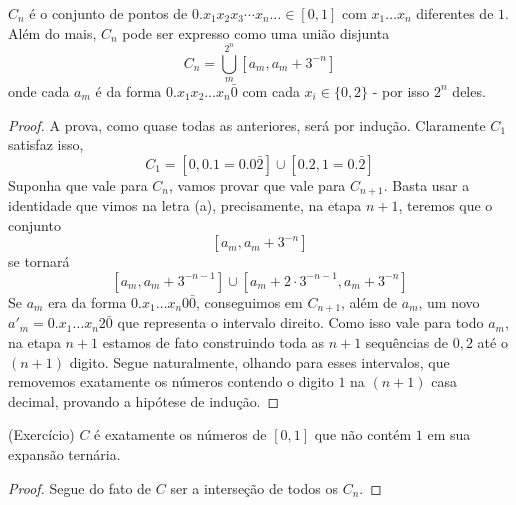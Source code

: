 \begin{enumerate}[label=(\alph*)]
    \begin{prop}
        $C_n$ é o conjunto de pontos de $ 0.x_1x_2x_3\cdots x_n\dots \in [0,1]$ com $x_1 \dots x_n$ diferentes de $1$.
        Além do mais, $C_n$ pode ser expresso como uma união disjunta
        $$C_n = \bigcup_m^{2^n} [a_m, a_m + 3^{-n}]$$
        onde cada $a_m$ é da forma $0.x_1x_2\dots x_n\bar{0}$ com cada $x_i \in \{0,2\}$ - por isso $2^n$ deles.
    \end{prop}
    \begin{proof}
        A prova, como quase todas as anteriores, será por indução. Claramente $C_1$ satisfaz isso,
        $$C_1 = [0,0.1 = 0.0\bar{2}] \cup [0.2, 1 = 0.\bar{2}]$$
        Suponha que vale para $C_n$, vamos provar que vale para $C_{n+1}$. Basta usar a identidade que vimos 
        na letra (a), precisamente, na etapa $n+1$, teremos que o conjunto
        $$[a_m, a_m+3^{-n}]$$
        se tornará 
        $$[a_m, a_m + 3^{-n - 1}] \cup [a_m + 2\cdot3^{-n - 1}, a_m + 3^{-n}]$$
        Se $a_m$ era da forma $0.x_1\dots x_n0\bar{0}$, conseguimos em $C_{n+1}$, além de $a_m$, um novo $a'_m = 0.x_1\dots x_n2\bar{0}$
        que representa o intervalo direito. Como isso vale para todo $a_m$, na etapa $n+1$ estamos de fato 
        construindo toda as $n+1$ sequências de $0,2$ até o $(n+1)$ digito. Segue naturalmente, olhando para esses intervalos, 
        que removemos exatamente os números contendo o digito $1$ na $(n+1)$ casa decimal, provando a hipótese de indução.
    \end{proof}
    \begin{corollary}
        (Exercício) $C$ é exatamente os números de $[0,1]$ que não contém $1$ em sua expansão ternária.
    \end{corollary}
    \begin{proof}
        Segue do fato de $C$ ser a interseção de todos os $C_n$.  
    \end{proof}
\end{enumerate}